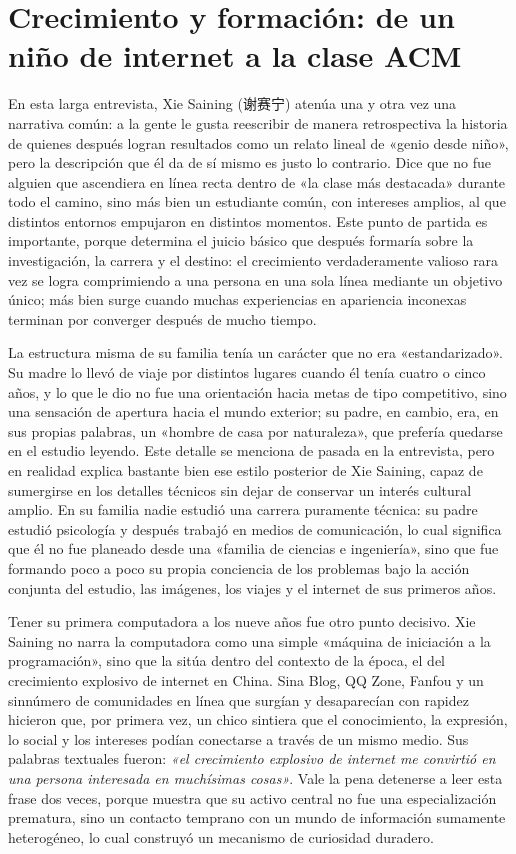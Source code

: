 \section{Crecimiento y formación: de un niño de internet a la clase ACM}

En esta larga entrevista, Xie Saining (谢赛宁) atenúa una y otra vez una narrativa común: a la gente le gusta reescribir de manera retrospectiva la historia de quienes después logran resultados como un relato lineal de «genio desde niño», pero la descripción que él da de sí mismo es justo lo contrario. Dice que no fue alguien que ascendiera en línea recta dentro de «la clase más destacada» durante todo el camino, sino más bien un estudiante común, con intereses amplios, al que distintos entornos empujaron en distintos momentos. Este punto de partida es importante, porque determina el juicio básico que después formaría sobre la investigación, la carrera y el destino: el crecimiento verdaderamente valioso rara vez se logra comprimiendo a una persona en una sola línea mediante un objetivo único; más bien surge cuando muchas experiencias en apariencia inconexas terminan por converger después de mucho tiempo.

La estructura misma de su familia tenía un carácter que no era «estandarizado». Su madre lo llevó de viaje por distintos lugares cuando él tenía cuatro o cinco años, y lo que le dio no fue una orientación hacia metas de tipo competitivo, sino una sensación de apertura hacia el mundo exterior; su padre, en cambio, era, en sus propias palabras, un «hombre de casa por naturaleza», que prefería quedarse en el estudio leyendo. Este detalle se menciona de pasada en la entrevista, pero en realidad explica bastante bien ese estilo posterior de Xie Saining, capaz de sumergirse en los detalles técnicos sin dejar de conservar un interés cultural amplio. En su familia nadie estudió una carrera puramente técnica: su padre estudió psicología y después trabajó en medios de comunicación, lo cual significa que él no fue planeado desde una «familia de ciencias e ingeniería», sino que fue formando poco a poco su propia conciencia de los problemas bajo la acción conjunta del estudio, las imágenes, los viajes y el internet de sus primeros años.

Tener su primera computadora a los nueve años fue otro punto decisivo. Xie Saining no narra la computadora como una simple «máquina de iniciación a la programación», sino que la sitúa dentro del contexto de la época, el del crecimiento explosivo de internet en China. Sina Blog, QQ Zone, Fanfou y un sinnúmero de comunidades en línea que surgían y desaparecían con rapidez hicieron que, por primera vez, un chico sintiera que el conocimiento, la expresión, lo social y los intereses podían conectarse a través de un mismo medio. Sus palabras textuales fueron: \textit{«el crecimiento explosivo de internet me convirtió en una persona interesada en muchísimas cosas»}. Vale la pena detenerse a leer esta frase dos veces, porque muestra que su activo central no fue una especialización prematura, sino un contacto temprano con un mundo de información sumamente heterogéneo, lo cual construyó un mecanismo de curiosidad duradero.

